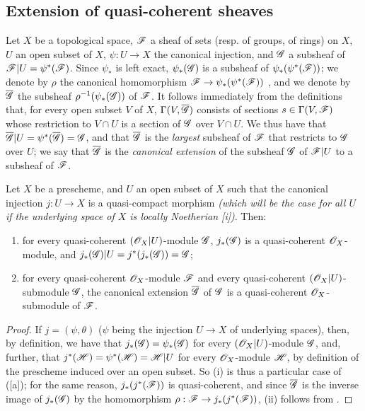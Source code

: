 \subsection{Extension of quasi-coherent sheaves}
\label{subsection:1.9.4}

\begin{env}[9.4.1]
\label{1.9.4.1}
Let
$X$ be a topological space, $\mathscr{F}$ a sheaf of sets (resp. of groups, of rings) on $X$, $U$
an open subset of $X$, $\psi:U\to X$ the canonical injection, and $\mathscr{G}$ a subsheaf of
$\mathscr{F}|U=\psi^*(\mathscr{F})$. Since $\psi_*$ is left exact, $\psi_*(\mathscr{G})$ is a subsheaf of
$\psi_*(\psi^*(\mathscr{F}))$; we denote by $\rho$ the canonical homomorphism
$\sh{F}\to\psi_*(\psi^*(\sh{F}))$ , and we denote by $\overline{\mathscr{G}}$
the subsheaf $\rho^{-1}(\psi_*(\mathscr{G}))$ of $\mathscr{F}$. It follows immediately from the
definitions that, for every open subset $V$ of $X$, $\Gamma(V,\overline{\mathscr{G}})$ consists of
sections $s\in\Gamma(V,\mathscr{F})$ whose restriction to $V\cap U$ is a section of $\mathscr{G}$ over
$V\cap U$. We thus have that $\overline{\mathscr{G}}|U=\psi^*(\overline{\mathscr{G}})=\mathscr{G}$, and that
$\overline{\mathscr{G}}$ is the \emph{largest} subsheaf of $\mathscr{F}$ that restricts to $\mathscr{G}$
over $U$; we say that $\overline{\mathscr{G}}$ is the \emph{canonical extension} of the subsheaf
$\mathscr{G}$ of $\mathscr{F}|U$ to a subsheaf of $\mathscr{F}$.
\end{env}

\begin{proposition}[9.4.2]
\label{1.9.4.2}
Let $X$ be a prescheme, and $U$ an open subset of $X$ such that the canonical injection
$j:U\to X$ is a quasi-compact morphism \emph{(which will be the case for \emph{all} $U$ if
the underlying space of $X$ is \emph{locally Noetherian}
[i])}. Then:
\begin{enumerate}[label=\emph{(\roman*)}]
  \item for every quasi-coherent $(\mathscr{O}_X|U)$-module $\mathscr{G}$, $j_*(\mathscr{G})$
    is a quasi-coherent $\mathscr{O}_X$-module, and $j_*(\mathscr{G})|U=j^*(j_*(\mathscr{G}))=\mathscr{G}$;
  \item for every quasi-coherent $\mathscr{O}_X$-module $\mathscr{F}$ and every quasi-coherent
    $(\mathscr{O}_X|U)$-submodule $\mathscr{G}$, the canonical extension
    $\overline{\mathscr{G}}$ of $\mathscr{G}$  is a
    quasi-coherent $\mathscr{O}_X$-submodule of $\mathscr{F}$.
\end{enumerate}
\end{proposition}

\begin{proof}
\label{proof-1.9.4.2}
If $j=(\psi,\theta)$ ($\psi$ being the injection $U\to X$ of underlying spaces), then, by
definition, we have that $j_*(\mathscr{G})=\psi_*(\mathscr{G})$ for every $(\mathscr{O}_X|U)$-module $\mathscr{G}$,
and, further, that $j^*(\mathscr{H})=\psi^*(\mathscr{H})=\mathscr{H}|U$ for every $\mathscr{O}_X$-module $\mathscr{H}$,
by definition of the prescheme induced over an open subset. So (i) is thus a particular case
of ([a]); for the same reason, $j_*(j^*(\mathscr{F}))$ is quasi-coherent, and
since $\overline{\mathscr{G}}$ is the inverse image of $j_*(\mathscr{G})$ by the homomorphism
$\rho:\sh{F}\to j_*(j^*(\sh{F}))$, (ii) follows from .
\end{proof}


